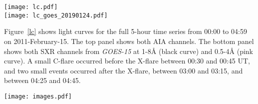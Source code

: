 \begin{figure*}[htb!]\centering
    \texttt{[image: lc.pdf]}\\
    \texttt{[image: lc\_goes\_20190124.pdf]}
    \caption{%
        Top: Light curves of the
        UV continuum emission from AIA 1600\AA{} (blue curve) and
        AIA 1700\AA{} (red curve),
        integrated over the flare region in AR 11158.
        Bottom: Light curves from \textit{GOES-15}
        channels 1-8\AA{} (black curve) and 0.5-4\AA{} (pink curve),
        scaled as log(flux) to enable visibility of the increases
        during smaller events before and
        after the main X-flare.
        \label{lc}}
\end{figure*}


Figure~\ref{lc} shows light curves for the full 5-hour time series
from 00:00 to 04:59 on 2011-February-15.
The top panel shows both AIA channels.
The bottom panel shows both SXR channels from \textit{GOES-15} at
1-8\AA{} (black curve) and 0.5-4\AA{} (pink curve).
A small C-flare occurred before the X-flare between 00:30 and 00:45 UT, and
two small events occurred after the X-flare,
between 03:00 and 03:15, and between 04:25 and 04:45.

\begin{figure*}[htb!]\centering
    \texttt{[image: images.pdf]}
    \caption{
        Images of active region 11158 in AIA 1600\AA{} (left panels),
        AIA 1700\AA{} (middle panels), and HMI LOS magnetogram (right panels),
        scaled to $\pm300$ Gauss.
        The top panels show the full disk,
        and the bottom panels show the region used for analysis in this study.
        \label{images}}
\end{figure*}


